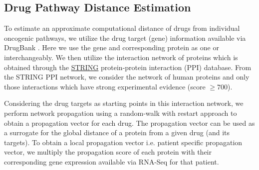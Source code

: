 \documentclass[pdflatex,sn-mathphys-num]{sn-jnl}%
\theoremstyle{thmstyleone}%
\theoremstyle{thmstyletwo}%
\theoremstyle{thmstylethree}%
\begin{document}
\subsection{Drug Pathway Distance Estimation}
To estimate an approximate computational distance of drugs from individual oncogenic pathways, we utilize the drug target (gene) information available via DrugBank \cite{knox2024drugbank}. Here we use the gene and corresponding protein as one or interchangeably. We then utilize the interaction network of proteins which is obtained through the \href{https://string-db.org/}{STRING} protein-protein interaction (PPI) database. From the STRING PPI network, we consider the network of human proteins and only those interactions which have strong experimental evidence (score $\ge700$).

Considering the drug targets as starting points in this interaction network, we perform network propagation using a random-walk with restart approach \cite{sherif2022immune,mall2013kernel} to obtain a propagation vector for each drug. The propagation vector can be used as a surrogate for the global distance of a protein from a given drug (and its targets). To obtain a local propagation vector i.e. patient specific propagation vector, we multiply the propagation score of each protein with their corresponding gene expression available via RNA-Seq for that patient. 
\end{document}
